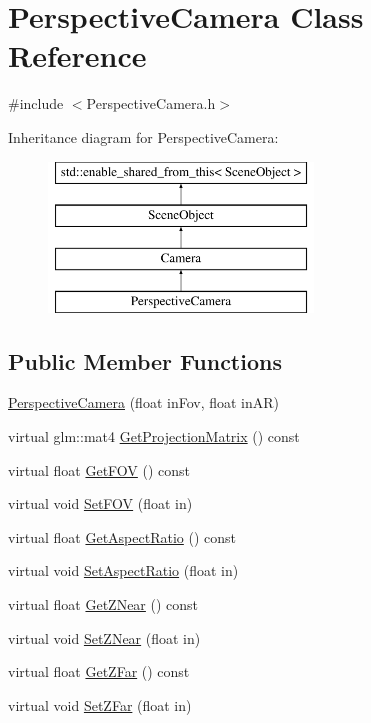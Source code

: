 \hypertarget{class_perspective_camera}{}\section{Perspective\+Camera Class Reference}
\label{class_perspective_camera}


{\ttfamily \#include $<$Perspective\+Camera.\+h$>$}

Inheritance diagram for Perspective\+Camera\+:\begin{figure}[H]
\begin{center}
\leavevmode
\includegraphics[height=4.000000cm]{class_perspective_camera}
\end{center}
\end{figure}
\subsection*{Public Member Functions}
\begin{DoxyCompactItemize}
\item 
\hyperlink{class_perspective_camera_adb5624bfee18c9390df3ba0612431124}{Perspective\+Camera} (float in\+Fov, float in\+A\+R)
\item 
virtual glm\+::mat4 \hyperlink{class_perspective_camera_a24a338c552cede73ae7d69527ec85817}{Get\+Projection\+Matrix} () const 
\item 
virtual float \hyperlink{class_perspective_camera_a47ca1c9615ef9cb9dbe3436e561b76a0}{Get\+F\+O\+V} () const 
\item 
virtual void \hyperlink{class_perspective_camera_a03f2ce1c0940599712b12a07719b5122}{Set\+F\+O\+V} (float in)
\item 
virtual float \hyperlink{class_perspective_camera_a02d3e3a9a8b3770ed0cad810a3946dee}{Get\+Aspect\+Ratio} () const 
\item 
virtual void \hyperlink{class_perspective_camera_a2f8753cd16d119ed00d050b4dbac2510}{Set\+Aspect\+Ratio} (float in)
\item 
virtual float \hyperlink{class_perspective_camera_a42fbe0fea96a362cd6e5e7e6414843ac}{Get\+Z\+Near} () const 
\item 
virtual void \hyperlink{class_perspective_camera_ab9bab141c767e0b604b213f482f72c8a}{Set\+Z\+Near} (float in)
\item 
virtual float \hyperlink{class_perspective_camera_a7e954166961c8d643c24fec0aa0261a4}{Get\+Z\+Far} () const 
\item 
virtual void \hyperlink{class_perspective_camera_a4374ca73880370dad1b93eaf489c9bb4}{Set\+Z\+Far} (float in)
\end{DoxyCompactItemize}
